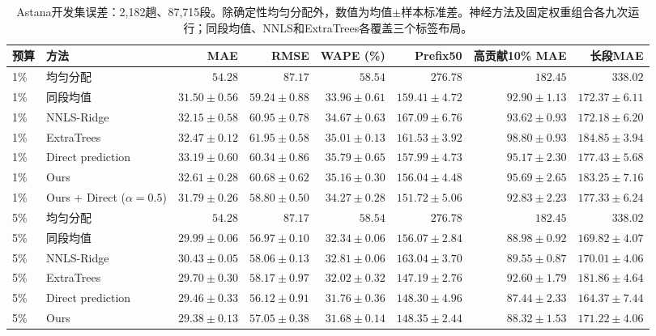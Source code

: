 \begin{table}[t]
\centering\scriptsize\setlength{\tabcolsep}{2.5pt}
\caption{Astana开发集误差：2,182趟、87,715段。除确定性均匀分配外，数值为均值$\pm$样本标准差。神经方法及固定权重组合各九次运行；同段均值、NNLS和ExtraTrees各覆盖三个标签布局。}\label{tab:limited}
\begin{tabular}{llrrrrrr}\toprule
预算 & 方法 & MAE & RMSE & WAPE (\%) & Prefix50 & 高贡献10\% MAE & 长段MAE\\\midrule
1\% & 均匀分配 & $54.28$ & $87.17$ & $58.54$ & $276.78$ & $182.45$ & $338.02$\\
1\% & 同段均值 & $\mathbf{31.50\pm0.56}$ & $59.24\pm0.88$ & $\mathbf{33.96\pm0.61}$ & $159.41\pm4.72$ & $92.90\pm1.13$ & $172.37\pm6.11$\\
1\% & NNLS-Ridge & $32.15\pm0.58$ & $60.95\pm0.78$ & $34.67\pm0.63$ & $167.09\pm6.76$ & $93.62\pm0.93$ & $\mathbf{172.18\pm6.20}$\\
1\% & ExtraTrees & $32.47\pm0.12$ & $61.95\pm0.58$ & $35.01\pm0.13$ & $161.53\pm3.92$ & $98.80\pm0.93$ & $184.85\pm3.94$\\
1\% & Direct prediction & $33.19\pm0.60$ & $60.34\pm0.86$ & $35.79\pm0.65$ & $157.99\pm4.73$ & $95.17\pm2.30$ & $177.43\pm5.68$\\
1\% & Ours & $32.61\pm0.28$ & $60.68\pm0.62$ & $35.16\pm0.30$ & $156.04\pm4.48$ & $95.69\pm2.65$ & $183.25\pm7.16$\\
1\% & Ours + Direct ($\alpha=0.5$) & $31.79\pm0.26$ & $\mathbf{58.80\pm0.50}$ & $34.27\pm0.28$ & $\mathbf{151.72\pm5.06}$ & $\mathbf{92.83\pm2.23}$ & $177.33\pm6.24$\\
\midrule
5\% & 均匀分配 & $54.28$ & $87.17$ & $58.54$ & $276.78$ & $182.45$ & $338.02$\\
5\% & 同段均值 & $29.99\pm0.06$ & $56.97\pm0.10$ & $32.34\pm0.06$ & $156.07\pm2.84$ & $88.98\pm0.92$ & $169.82\pm4.07$\\
5\% & NNLS-Ridge & $30.43\pm0.05$ & $58.06\pm0.13$ & $32.81\pm0.06$ & $163.04\pm3.70$ & $89.55\pm0.87$ & $170.01\pm4.06$\\
5\% & ExtraTrees & $29.70\pm0.30$ & $58.17\pm0.97$ & $32.02\pm0.32$ & $147.19\pm2.76$ & $92.60\pm1.79$ & $181.86\pm4.64$\\
5\% & Direct prediction & $29.46\pm0.33$ & $56.12\pm0.91$ & $31.76\pm0.36$ & $148.30\pm4.96$ & $87.44\pm2.33$ & $\mathbf{164.37\pm7.44}$\\
5\% & Ours & $29.38\pm0.13$ & $57.05\pm0.38$ & $31.68\pm0.14$ & $148.35\pm2.44$ & $88.32\pm1.53$ & $171.22\pm4.06$\\

\end{tabular}
\end{table}
